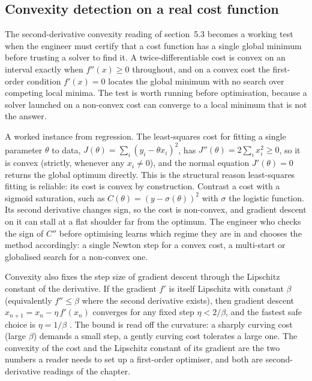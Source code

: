\subsection{Convexity detection on a real cost function}

The second-derivative convexity reading of section~5.3 becomes a working
test when the engineer must certify that a cost function has a single
global minimum before trusting a solver to find it. A twice-differentiable
cost is convex on an interval exactly when $f''(x) \geq 0$ throughout, and
on a convex cost the first-order condition $f'(x) = 0$ locates the global
minimum with no search over competing local minima. The test is
worth running before optimisation, because a solver launched on a
non-convex cost can converge to a local minimum that is not the answer.

A worked instance from regression. The least-squares cost for fitting a
single parameter $\theta$ to data, $J(\theta) = \sum_{i} (y_{i} -
\theta x_{i})^{2}$, has $J''(\theta) = 2\sum_{i} x_{i}^{2} \geq 0$, so it
is convex (strictly, whenever any $x_{i} \neq 0$), and the normal
equation $J'(\theta) = 0$ returns the global optimum directly. This is
the structural reason least-squares fitting is reliable: its cost is
convex by construction. Contrast a cost with a sigmoid saturation, such
as $C(\theta) = (y - \sigma(\theta))^{2}$ with $\sigma$ the logistic
function. Its second derivative changes sign, so the cost is non-convex,
and gradient descent on it can stall at a flat shoulder far from the
optimum. The engineer who checks the sign of $C''$ before optimising
learns which regime they are in and chooses the method accordingly:
a single Newton step for a convex cost, a multi-start or globalised
search for a non-convex one.

Convexity also fixes the step size of gradient descent through the
Lipschitz constant of the derivative. If the gradient $f'$ is itself
Lipschitz with constant $\beta$ (equivalently $f'' \leq \beta$ where the
second derivative exists), then gradient descent $x_{n+1} = x_{n} -
\eta\,f'(x_{n})$ converges for any fixed step $\eta < 2/\beta$, and the
fastest safe choice is $\eta = 1/\beta$
\cite{text:boyd-vandenberghe2004}. The bound is read off the curvature:
a sharply curving cost (large $\beta$) demands a small step, a gently
curving cost tolerates a large one. The convexity of the cost and the
Lipschitz constant of its gradient are the two numbers a reader needs to
set up a first-order optimiser, and both are second-derivative readings
of the chapter.

